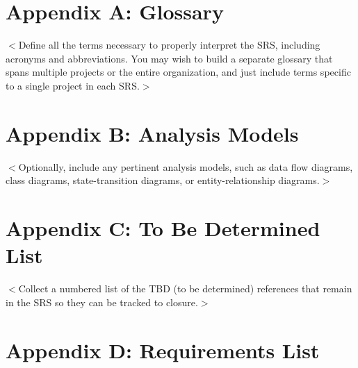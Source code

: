 \documentclass{scrreprt}
\begin{document}
\section{Appendix A: Glossary}
$<$Define all the terms necessary to properly interpret the SRS, including 
acronyms and abbreviations. You may wish to build a separate glossary that spans 
multiple projects or the entire organization, and just include terms specific to 
a single project in each SRS.$>$

\section{Appendix B: Analysis Models}
$<$Optionally, include any pertinent analysis models, such as data flow 
diagrams, class diagrams, state-transition diagrams, or entity-relationship 
diagrams.$>$

\section{Appendix C: To Be Determined List}
$<$Collect a numbered list of the TBD (to be determined) references that remain 
in the SRS so they can be tracked to closure.$>$

\section{Appendix D: Requirements List}

\tableofreqmts
\end{document}
